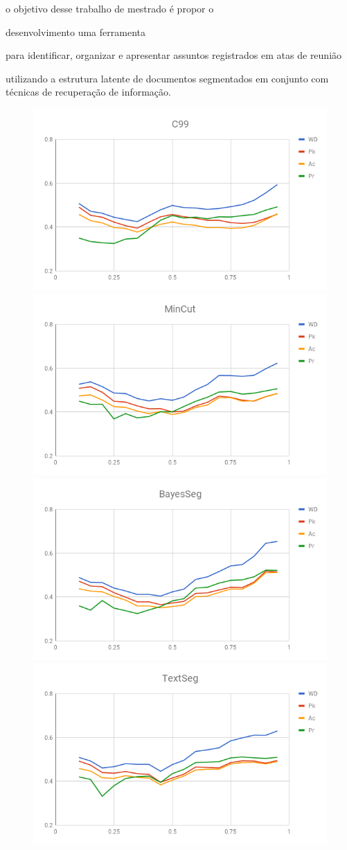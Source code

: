 o objetivo desse trabalho de mestrado é propor o 





desenvolvimento uma ferramenta 


para identificar, organizar e apresentar assuntos registrados em atas de reunião 


utilizando a estrutura latente de documentos segmentados em conjunto com técnicas de recuperação de informação.











\begin{figure}[!h] \centering     %

	  \includegraphics[width=.48\textwidth]{images/graficos/analiseNSegRate-C99.png}
	  \includegraphics[width=.48\textwidth]{images/graficos/analiseNSegRate-MinCut.png}
	  \includegraphics[width=.48\textwidth]{images/graficos/analiseNSegRate-Bayes.png}
	  \includegraphics[width=.48\textwidth]{images/graficos/analiseNSegRate-UISeg.png}
	\label{fig:influencia-SegRate}
\end{figure}
